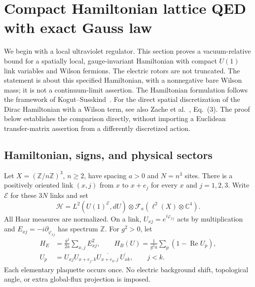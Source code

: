 \section{Compact Hamiltonian lattice QED with exact Gauss law}
\label{lat-section}

We begin with a local ultraviolet regulator. This section proves a vacuum-relative
bound for a spatially local, gauge-invariant Hamiltonian with compact
$U(1)$ link variables and Wilson fermions.  The electric rotors are not
truncated.  The statement is about this specified Hamiltonian, with a
nonnegative bare Wilson mass; it is not a continuum-limit assertion.
The Hamiltonian formulation follows the framework of
Kogut--Susskind~\cite{KogutSusskind}.
For the direct spatial discretization of the Dirac Hamiltonian with a
Wilson term, see also
Zache et al.~\cite{Zache}, Eq.~(3).
The proof below establishes the comparison directly, without importing a
Euclidean transfer-matrix assertion from a differently discretized action.

\subsection{Hamiltonian, signs, and physical sectors}

Let $X=(\mathbb Z/n\mathbb Z)^3$, $n\ge2$, have spacing $a>0$ and
$N=n^3$ sites.  There is a positively oriented link $(x,j)$ from $x$ to
$x+e_j$ for every $x$ and $j=1,2,3$.  Write $\mathcal E$ for these
$3N$ links and set
\begin{equation}
 \mathcal H=L^2(U(1)^{\mathcal E},dU)
       \otimes\mathcal F_{\!a}(\ell^2(X)\otimes\mathbb C^4).
 \label{lat-hilbert}
\end{equation}
All Haar measures are normalized.  On a link,
$U_{xj}=e^{i\varphi_{xj}}$ acts by multiplication and
$E_{xj}=-i\partial_{\varphi_{xj}}$ has spectrum $\mathbb Z$.
For $g^2>0$, let
\begin{align}
 H_E&=\frac{g^2}{2a}\sum_{x,j}E_{xj}^2,\qquad
 H_B(U)=\frac1{g^2a}\sum_p(1-\operatorname{Re}U_p),
 \label{lat-gauge-energy}\\
 U_p&=U_{xj}U_{x+e_j,k}\overline{U_{x+e_k,j}}\,
          \overline{U_{xk}},\qquad j<k.
 \nonumber
\end{align}
Each elementary plaquette occurs once.  No electric background shift,
topological angle, or extra global-flux projection is imposed.

